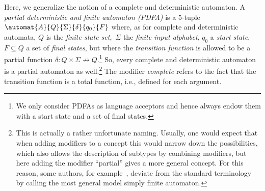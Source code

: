 
Here, we generalize the notion of a complete and deterministic automaton.
A \emph{partial deterministic and finite
	automaton (PDFA)}
is a $5$-tuple $\automat{A}{Q}{\Sigma}{\delta}{q_0}{F}$
where, as for complete and deterministic automata, $Q$ is the \emph{finite state set},~$\Sigma$
the \emph{finite input alphabet}, $q_0$ a \emph{start state}, $F \subseteq Q$ a set of \emph{final states}, but where
 the \emph{transition function} is allowed to be a partial function $\delta \colon Q \times \Sigma \nrightarrow Q$.\footnote{We only consider PDFAs as language acceptors and hence always endow them with a start state and a set of final states.}
So, every complete and deterministic automaton is a partial automaton as well.\footnote{This is actually a rather unfortunate naming. Usually,
	one would expect that when adding modifiers to a concept
	this would narrow down the possibilities, which also allows the description of subtypes by combining modifiers,
	but here adding	the modifier ``partial'' gives a more general concept.
	For this reason, some authors, for example~\cite{DBLP:journals/tcs/CaiF22},
	deviate from the standard terminology by calling the most general model simply finite automaton.}
The modifier \emph{complete}
refers to the fact that the transition function is a total function, i.e., defined for each argument. 

\smallskip
\begin{center}
\end{center}
\smallskip

